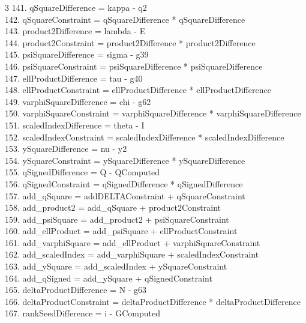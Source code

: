 \documentclass[10pt]{article}
\begin{document}
\begin{multicols}{3}
141. qSquareDifference = kappa - q2\\
142. qSquareConstraint = qSquareDifference * qSquareDifference\\
143. product2Difference = lambda - E\\
144. product2Constraint = product2Difference * product2Difference\\
145. psiSquareDifference = sigma - g39\\
146. psiSquareConstraint = psiSquareDifference * psiSquareDifference\\
147. ellProductDifference = tau - g40\\
148. ellProductConstraint = ellProductDifference * ellProductDifference\\
149. varphiSquareDifference = chi - g62\\
150. varphiSquareConstraint = varphiSquareDifference * varphiSquareDifference\\
151. scaledIndexDifference = theta - I\\
152. scaledIndexConstraint = scaledIndexDifference * scaledIndexDifference\\
153. ySquareDifference = nu - y2\\
154. ySquareConstraint = ySquareDifference * ySquareDifference\\
155. qSignedDifference = Q - QComputed\\
156. qSignedConstraint = qSignedDifference * qSignedDifference\\
157. add\_qSquare = addDELTAConstraint + qSquareConstraint\\
158. add\_product2 = add\_qSquare + product2Constraint\\
159. add\_psiSquare = add\_product2 + psiSquareConstraint\\
160. add\_ellProduct = add\_psiSquare + ellProductConstraint\\
161. add\_varphiSquare = add\_ellProduct + varphiSquareConstraint\\
162. add\_scaledIndex = add\_varphiSquare + scaledIndexConstraint\\
163. add\_ySquare = add\_scaledIndex + ySquareConstraint\\
164. add\_qSigned = add\_ySquare + qSignedConstraint\\
165. deltaProductDifference = N - g63\\
166. deltaProductConstraint = deltaProductDifference * deltaProductDifference\\
167. rankSeedDifference = i - GComputed\\

\end{multicols}
\end{document}
